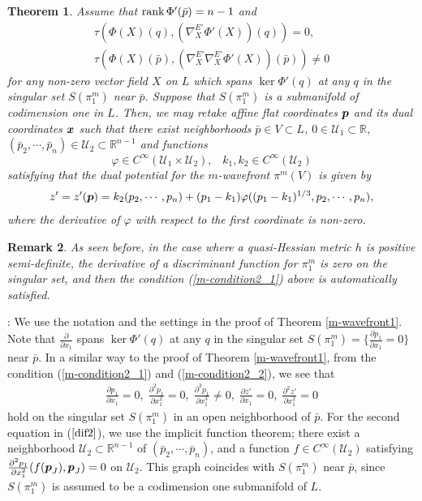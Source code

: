 \documentclass[10pt]{amsart}
\def\proof{\noindent {\sl Proof} :\;  }
\newcommand{\U}{\mathcal{U}}
\newcommand{\R}{\mathbb{R}}
\newcommand\rank{\mbox{\rm rank}\,}
\def\proof{\noindent {\sl Proof} :\;  }
\def\rd{\partial}
\def\bx{\mbox{\boldmath $x$}}
\def\bp{\mbox{\boldmath $p$}}
\newtheorem{thm}{\bf Theorem}[section]
\newtheorem{rem}[thm]{\bf Remark}
\newcommand{\vp}{\varphi}
\begin{document}
\begin{thm}\label{m-wavefront2}
Assume that $\rank \Phi'({\bar{p}}) = n-1$ and 
\begin{align}
\tau(\Phi(X)(q), (\nabla^{E'}_{X}\Phi'(X))(q)) = 0, \label{m-condition2_1}\\
\tau(\Phi(X)(\bar{p}), (\nabla^{E'}_{X}\nabla^{E'}_{X}\Phi'(X))(\bar{p})) \neq 0 \label{m-condition2_2}
\end{align}
for any non-zero vector field $X$ on $L$ which spans $\ker \Phi'(q)$ at any $q$ in the singular set $S(\pi^m_1)$ near $\bar{p}$. 
Suppose that $S(\pi^m_1)$ is a submanifold of codimension one in $L$.
Then, we may retake affine flat coordinates $\bp$ and its dual coordinates $\bx$ such that 
there exist neighborhoods  $\bar{p}\in V\subset L$, 
$0\in\U_1\subset\R$,
$(\bar{p}_2, \cdots, \bar{p}_n) \in\U_2\subset\R^{n-1}$ and functions 
$$\vp\in C^\infty(\U_1\times\U_2), \;\;\; k_1,k_2\in C^\infty(\U_2)$$ 
satisfying that 
the dual potential for the $m$-wavefront $\pi^m(V)$ is given by  
\begin{align}\label{normal_2}
z'=z'(\bp)=k_2(p_2,\cdots,p_n)+(p_1-k_1)\vp((p_1-k_1)^{1/3}, p_2,\cdots,p_n),
\end{align}
where the derivative of $\vp$ with respect to the first coordinate is non-zero.
\end{thm}

\begin{rem}\upshape
As seen before, in the case where a quasi-Hessian metric $h$ is positive semi-definite, the derivative of a discriminant function for $\pi^m_1$ is zero on the singular set, and then the condition (\ref{m-condition2_1}) above is automatically satisfied.
\end{rem}

\proof
We use the notation and the settings in the proof of Theorem \ref{m-wavefront1}. 
Note that $\frac{\rd}{\rd x_1}$ spans $\ker \Phi'(q)$ at any $q$ in the singular set $S(\pi^m_1)=\{\frac{\rd p_1}{\rd x_1}=0\}$ near $\bar{p}$.
In a similar way to the proof of Theorem \ref{m-wavefront1}, from the condition (\ref{m-condition2_1}) and (\ref{m-condition2_2}), we see that 
\begin{align}\label{dif2}
\frac{\rd p_1}{\rd x_1}=0,\; \frac{\rd^2 p_1}{\rd x_1^2}=0,\; \frac{\rd^3 p_1}{\rd x_1^3}\neq0,\; \frac{\rd z'}{\rd x_1}=0,\; \frac{\rd^2 z'}{\rd x_1^2}=0
\end{align}
hold on the singular set $S(\pi_1^m)$ in an open neighborhood of $\bar{p}$. 
For the second equation in ($\ref{dif2}$), we use the implicit function theorem; there exist a neighborhood $\U_2\subset \R^{n-1}$ of $(\bar{p}_2, \cdots, \bar{p}_n)$, and a function $f\in C^{\infty}(\U_2)$ satisfying $\frac{\rd^2 p_1}{\rd x_1^2}(f(\bp_J),\bp_J)=0$ on $\U_2$. 
This graph coincides with $S(\pi_1^m)$ near $\bar{p}$, since $S(\pi_1^m)$ is assumed to be a codimension one submanifold of $L$. 
\end{document}
